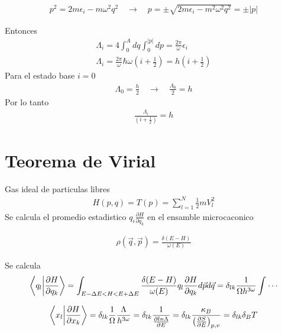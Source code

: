 \documentclass{article}
\begin{document}
\hfill 

\hfill 

\hfill 

\begin{gather*}
  p^2 = 2m \epsilon_i - m \omega^2 q^2 \quad \rightarrow \quad p = \pm \sqrt{2m \epsilon_i - m^2 \omega^2 q^2 } = \pm \left|p \right| 
\end{gather*}

Entonces 
\begin{gather*}
  \Lambda_i = 4 \int_{0 }^{A } dq \int_{0 }^{\left|p \right|} dp = \frac{2\pi}{\omega} \epsilon_i \\
  \Lambda_i = \frac{2\pi}{\omega} \hbar \omega(i + \frac{1}{2}) = h (i + \frac{1}{2})
\end{gather*}
Para el estado base $ i = 0  $ 
\begin{gather*}
  \Lambda_0 = \frac{h }{2} \quad \rightarrow \quad \frac{\Lambda_0 }{2 } = h  
\end{gather*}
Por lo tanto 
\begin{gather*}
  \frac{\Lambda_i }{\left(i + \frac{1}{2}\right)} = h 
\end{gather*}


\section{Teorema de Virial }
Gas ideal de particulas libres 
\begin{gather*}
  H(p,q) = T(p) = \displaystyle\sum_{ l = 1 }^{ N } \frac{1}{2}m V_l^2 
\end{gather*}
Se calcula el promedio estadistico $ q_i \frac{\partial H  }{\partial q_k } $ en el ensamble microcaconico 

\begin{gather*}
  \rho(\vec q, \vec p ) = \frac{\delta (E- H)}{\omega(E)} 
\end{gather*}

Se calcula 
\begin{gather*}
  \bra{q_l }\ket{\frac{\partial H  }{\partial q_k }} = \int_{E- \Delta E < H < E + \Delta E }^{}  \frac{\delta (E- H)}{\omega(E)} q_l \frac{\partial H  }{\partial q_k } d \vec p d \vec q  = \delta _{lk } \frac{1}{\Omega h ^ {3\omega}} \int_{}^{}\cdots 
\end{gather*}

\begin{gather*}
  \bra{x_l }\ket{\frac{\partial H  }{\partial x_k }} = \delta _{lk }  \frac{1}{\Omega }\frac{\Lambda}{h ^ {3\omega}} = \delta _{lk } \frac{1}{\frac{\partial ln \Lambda }{\partial E }} = \delta _{lk } \frac{\kappa_B }{\left(\frac{\partial S  }{\partial E }\right) _{p,v} } = \delta _{lk } \delta_B   T
\end{gather*}
\end{document}
